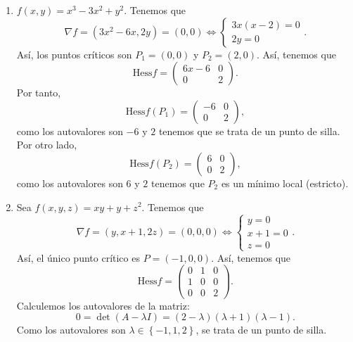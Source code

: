 \begin{eg}
\begin{enumerate}
\item $\displaystyle f\left(x,y\right) = x^{3}-3x^{2}+y^{2} $. Tenemos que 
	\[\nabla f = \left(3x^{2}-6x, 2y\right) = \left(0,0\right) \iff 
	\begin{cases}
	3x\left(x-2\right) = 0 \\
	2y = 0
	\end{cases}
	.\]
Así, los puntos críticos son $\displaystyle P_{1} = \left(0,0\right) $ y $\displaystyle P_{2} = \left(2,0\right) $. 
Así, tenemos que 
\[\text{Hess}f = \begin{pmatrix} 6x-6 & 0  \\ 0 & 2 \end{pmatrix} .\]
Por tanto, 
\[\text{Hess}f\left(P_{1}\right) = \begin{pmatrix} -6 & 0 \\ 0 & 2 \end{pmatrix} ,\]
como los autovalores son $\displaystyle -6 $ y $\displaystyle 2 $ tenemos que se trata de un punto de silla. Por otro lado, 
\[\text{Hess}f\left(P_{2}\right) = \begin{pmatrix} 6 & 0 \\ 0 & 2 \end{pmatrix} ,\]
como los autovalores son $\displaystyle 6 $ y $\displaystyle 2 $ tenemos que $\displaystyle P_{2} $ es un mínimo local (estricto).
\item Sea $\displaystyle f\left(x,y,z\right) = xy + y + z^{2} $. Tenemos que 
	\[\nabla f = \left(y, x+1, 2z\right) = \left(0,0,0\right)\iff 
	\begin{cases}
	y = 0\\
	x + 1 = 0 \\
	z = 0
	\end{cases}
	.\]
	Así, el único punto crítico es $\displaystyle P = \left(-1,0,0\right) $. Así, tenemos que 
	\[\text{Hess}f = \begin{pmatrix} 0 & 1 & 0 \\ 1 & 0 & 0 \\ 0 & 0 & 2 \end{pmatrix} .\]
Calculemos los autovalores de la matriz:
\[0 = \det\left(A - \lambda I\right) = \left(2-\lambda \right)\left(\lambda + 1\right)\left(\lambda - 1\right) .\]
Como los autovalores son $\displaystyle \lambda \in \left\{ -1,1,2\right\}  $, se trata de un punto de silla. 
\end{enumerate}
\end{eg}
